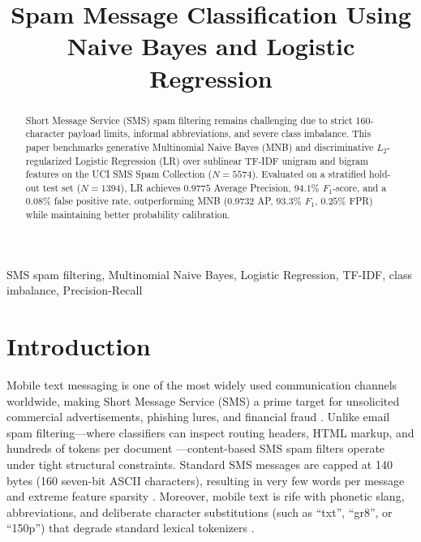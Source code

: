 \documentclass[conference]{IEEEtran}
\begin{document}
\title{Spam Message Classification Using Naive Bayes and Logistic Regression}

\author{
\and
{}
}

\maketitle

\begin{abstract}
Short Message Service (SMS) spam filtering remains challenging due to strict
160-character payload limits, informal abbreviations, and severe class
imbalance. This paper benchmarks generative Multinomial Naive Bayes (MNB) and
discriminative $L_2$-regularized Logistic Regression (LR) over sublinear
TF-IDF unigram and bigram features on the UCI SMS Spam Collection
($N = 5574$). Evaluated on a stratified hold-out test set ($N = 1394$), LR
achieves $0.9775$ Average Precision, $94.1\%$ $F_1$-score, and a $0.08\%$
false positive rate, outperforming MNB ($0.9732$ AP, $93.3\%$ $F_1$, $0.25\%$
FPR) while maintaining better probability calibration.
\end{abstract}

\begin{IEEEkeywords}
SMS spam filtering, Multinomial Naive Bayes, Logistic Regression, TF-IDF,
class imbalance, Precision-Recall
\end{IEEEkeywords}


\section{Introduction}

Mobile text messaging is one of the most widely used communication channels
worldwide, making Short Message Service (SMS) a prime target for unsolicited
commercial advertisements, phishing lures, and financial fraud
\cite{10.1145/2034691.2034742, ALMEIDA201625}. Unlike email spam
filtering---where classifiers can inspect routing headers, HTML markup, and
hundreds of tokens per document \cite{metsis2006spam}---content-based SMS
spam filters operate under tight structural constraints. Standard SMS
messages are capped at 140 bytes (160 seven-bit ASCII characters), resulting
in very few words per message and extreme feature sparsity
\cite{10.1145/2034691.2034742}. Moreover, mobile text is rife with phonetic
slang, abbreviations, and deliberate character substitutions (such as
``txt'', ``gr8'', or ``150p'') that degrade standard lexical tokenizers
\cite{ALMEIDA201625}.
\end{document}
